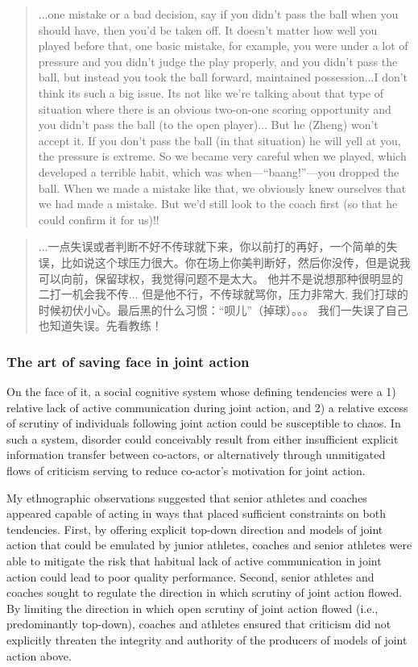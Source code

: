 \begin{CJK}{UTF8}{gbsn}
    \begin{quotation}
      ...one mistake or a bad decision, say if you didn't pass the ball when you should have, then you'd be taken off.  It doesn't matter how well you played before that, one basic mistake, for example, you were under a lot of pressure and you didn't judge the play properly, and you didn't pass the ball, but instead you took the ball forward, maintained possession...I don't think its such a big issue.
      Its not like we're talking about that type of situation where there is an obvious two-on-one scoring opportunity and you didn't pass the ball (to the open player)...
      But he (Zheng) won't accept it.  If you don't pass the ball (in that situation) he will yell at you, the pressure is extreme.  So we became very careful when we played, which developed a terrible habit, which was when---``baang!''---you dropped the ball. When we made a mistake like that, we obviously knew ourselves that we had made a mistake.  But we'd still look to the coach first (so that he could confirm it for us)!!
    \end{quotation}

    \begin{quotation}
      ...一点失误或者判断不好不传球就下来，你以前打的再好，一个简单的失误，比如说这个球压力很大。你在场上你美判断好，然后你没传，但是说我可以向前，保留球权，我觉得问题不是太大。
      他并不是说想那种很明显的二打一机会我不传...
      但是他不行，不传球就骂你，压力非常大, 我们打球的时候初伏小心。最后黑的什么习惯：“呗儿”（掉球）。。。 我们一失误了自己也知道失误。先看教练！
    \end{quotation}




\subsubsection{The art of saving face in joint action}
On the face of it, a social cognitive system whose defining tendencies were a 1) relative lack of active communication during joint action, and 2) a relative excess of scrutiny of individuals following joint action could be susceptible to chaos. In such a system, disorder could conceivably result from either insufficient explicit information transfer between co-actors, or alternatively through unmitigated flows of criticism serving to reduce co-actor's motivation for joint action.

My ethnographic observations suggested that senior athletes and coaches appeared capable of acting in ways that placed sufficient constraints on both tendencies.  First, by offering explicit top-down direction and models of joint action that could be emulated by junior athletes, coaches and senior athletes were able to mitigate the risk that habitual lack of active communication in joint action could lead to poor quality performance.  Second, senior athletes and coaches sought to regulate the direction in which scrutiny of joint action flowed.  By limiting the direction in which open scrutiny of joint action flowed (i.e., predominantly top-down), coaches and athletes ensured that criticism did not explicitly threaten the integrity and authority of the producers of models of joint action above.


\end{CJK}
